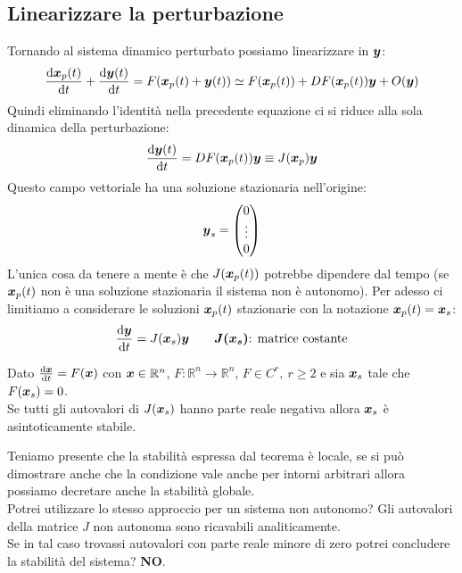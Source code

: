 \subsection{Linearizzare la perturbazione}%
Tornando al sistema dinamico perturbato possiamo linearizzare in $\boldsymbol{y}$:
\[
    \frac{\text{d} \boldsymbol{x}_p(t)}{\text{d} t} + \frac{\text{d} \boldsymbol{y} (t)}{\text{d} t} = 
    F(\boldsymbol{x}_p(t)+ \boldsymbol{y} (t)) \simeq 
    F(\boldsymbol{x}_p(t))+DF(\boldsymbol{x}_p(t))\boldsymbol{y}  + O(\boldsymbol{y})
\] 
Quindi eliminando l'identità nella precedente equazione ci si riduce alla sola dinamica della perturbazione:
\[
    \frac{\text{d} \boldsymbol{y} (t)}{\text{d} t} = DF(\boldsymbol{x}_p(t))\boldsymbol{y}\equiv
    J(\boldsymbol{x}_p)\boldsymbol{y}
\] 
Questo campo vettoriale ha una soluzione stazionaria nell'origine: 
\[
\boldsymbol{y}_s = \begin{pmatrix} 0 \\ \vdots \\ 0 \end{pmatrix}
\] 
L'unica cosa da tenere a mente è che $J(\boldsymbol{x}_p(t))$  potrebbe dipendere dal tempo (se $\boldsymbol{x}_p(t)$ non è una soluzione stazionaria il sistema non è autonomo). Per adesso ci limitiamo a considerare le soluzioni $\boldsymbol{x}_p(t)$  stazionarie con la notazione $\boldsymbol{x}_p(t) = \boldsymbol{x}_s$:
\[
    \frac{\text{d} \boldsymbol{y}}{\text{d} t} = J(\boldsymbol{x}_s)\boldsymbol{y}  \qquad \boldsymbol{J(\boldsymbol{x}_s)}  \text{: matrice costante}
\] 
\begin{thm}
    Dato $\frac{\text{d} \boldsymbol{x}}{\text{d} t} = F(\boldsymbol{x})$ con $\boldsymbol{x}\in\mathbb{R}^n$, $F:\mathbb{R}^n \to \mathbb{R}^n$, $F \in C^r, \ r\ge 2$ e sia $\boldsymbol{x}_s$ tale che $F(\boldsymbol{x}_s)=0$.\\
    Se tutti gli autovalori di $J(\boldsymbol{x}_s)$ hanno parte reale negativa allora $\boldsymbol{x}_s$ è asintoticamente stabile.
\end{thm}
\noindent
Teniamo presente che la stabilità espressa dal teorema è locale, se si può dimostrare anche che la condizione vale anche per intorni arbitrari allora possiamo decretare anche la stabilità globale.\\
Potrei utilizzare lo stesso approccio per un sistema non autonomo? Gli autovalori della matrice $J$ non autonoma sono ricavabili analiticamente. \\
Se in tal caso trovassi autovalori con parte reale minore di zero potrei concludere la stabilità del sistema? \textbf{NO}.
